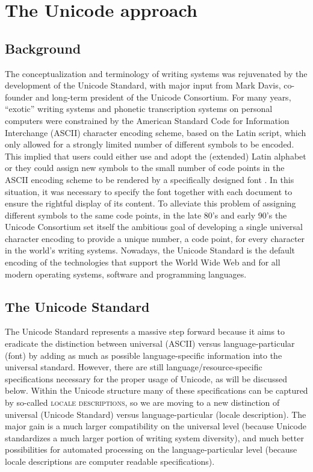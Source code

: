 \chapter{The Unicode approach}
\label{the-unicode-approach}

\section{Background}

The conceptualization and terminology of writing systems was rejuvenated by
the development of the Unicode Standard, with major input from Mark Davis,
co-founder and long-term president of the Unicode Consortium. For many years,
``exotic'' writing systems and phonetic transcription systems on personal
computers were constrained by the American Standard Code for Information
Interchange (ASCII) character encoding scheme, based on the Latin script, which
only allowed for a strongly limited number of different symbols to be encoded.
This implied that users could either use and adopt the (extended) Latin alphabet
or they could assign new symbols to the small number of code points in the ASCII
encoding scheme to be rendered by a specifically designed font
\citep{BirdSimons2003}. In this situation, it was necessary to specify the font
together with each document to ensure the rightful display of its content. To
alleviate this problem of assigning different symbols to the same code points,
in the late 80's and early 90's the Unicode Consortium set itself the ambitious
goal of developing a single universal character encoding to provide a unique
number, a code point, for every character in the world's writing systems.
Nowadays, the Unicode Standard is the default encoding of the technologies that
support the World Wide Web and for all modern operating systems, software and
programming languages.

\section{The Unicode Standard}

The Unicode Standard represents a massive step forward because it aims to
eradicate the distinction between universal (ASCII) versus language-particular
(font) by adding as much as possible language-specific information into the
universal standard. However, there are still language/resource-specific
specifications necessary for the proper usage of Unicode, as will be discussed
below. Within the Unicode structure many of these specifications can be captured
by so-called \textsc{locale descriptions}, so we are moving to a new distinction
of universal (Unicode Standard) versus language-particular (locale description).
The major gain is a much larger compatibility on the universal level (because
Unicode standardizes a much larger portion of writing system diversity), and
much better possibilities for automated processing on the language-particular
level (because locale descriptions are computer readable specifications).

